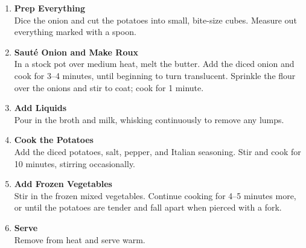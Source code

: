 \begin{enumerate}

      \item \textbf{Prep Everything} \\
            Dice the onion and cut the potatoes into small, bite-size cubes. Measure out everything marked with a spoon.

      \item \textbf{Sauté Onion and Make Roux} \\
            In a stock pot over medium heat, melt the butter. Add the diced onion and cook for 3--4 minutes, until beginning to turn translucent. Sprinkle the flour over the onions and stir to coat; cook for 1 minute.

      \item \textbf{Add Liquids} \\
            Pour in the broth and milk, whisking continuously to remove any lumps.

      \item \textbf{Cook the Potatoes} \\
            Add the diced potatoes, salt, pepper, and Italian seasoning. Stir and cook for 10 minutes, stirring occasionally.

      \item \textbf{Add Frozen Vegetables} \\
            Stir in the frozen mixed vegetables. Continue cooking for 4--5 minutes more, or until the potatoes are tender and fall apart when pierced with a fork.

      \item \textbf{Serve} \\
            Remove from heat and serve warm.

\end{enumerate}

